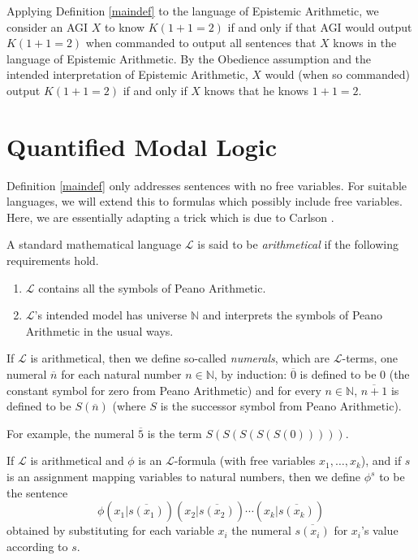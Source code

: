 \documentclass[runningheads]{llncs}
\begin{document}
\begin{example}
Applying Definition \ref{maindef} to the language of Epistemic Arithmetic,
we consider an AGI $X$ to know $K(1+1=2)$ if and only if that AGI would output
$K(1+1=2)$ when commanded to output all sentences that $X$ knows in the language of
Epistemic Arithmetic. By the Obedience assumption and the intended interpretation of
Epistemic Arithmetic, $X$ would (when so commanded)
output $K(1+1=2)$ if and only if $X$ knows that he knows $1+1=2$.
\end{example}

\section{Quantified Modal Logic}
\label{quantifiedsection}

Definition \ref{maindef} only addresses sentences with no free variables.
For suitable languages, we will extend this to formulas which possibly include
free variables. Here, we are essentially adapting a trick which is due to
Carlson \cite{carlson}.

\begin{definition}
  A standard mathematical language $\mathscr L$ is said to be \emph{arithmetical}
  if the following requirements hold.
  \begin{enumerate}
    \item $\mathscr L$ contains all the symbols of Peano Arithmetic.
    \item $\mathscr L$'s intended model has universe $\mathbb N$ and interprets
    the symbols of Peano Arithmetic in the usual ways.
  \end{enumerate}
\end{definition}

\begin{definition}
  If $\mathscr L$ is arithmetical, then we define so-called \emph{numerals}, which
  are $\mathscr L$-terms, one numeral $\overline n$ for each natural number $n\in\mathbb N$,
  by induction: $\overline 0$ is defined to be $0$ (the constant symbol for zero from
  Peano Arithmetic) and
  for every $n\in\mathbb N$, $\overline{n+1}$ is defined to be $S(\overline n)$
  (where $S$ is the successor symbol from Peano Arithmetic).
\end{definition}

For example, the numeral $\overline 5$ is the term $S(S(S(S(S(0)))))$.

\begin{definition}
  If $\mathscr L$ is arithmetical and $\phi$ is an $\mathscr L$-formula (with free variables
  $x_1,\ldots,x_k$),
  and if $s$ is an assignment mapping variables to natural numbers, then we define $\phi^s$
  to be the sentence
  \[
    \phi(x_1|\overline{s(x_1)})(x_2|\overline{s(x_2)})\cdots (x_k|\overline{s(x_k)})
  \]
  obtained by substituting for each variable $x_i$ the numeral $\overline{s(x_i)}$
  for $x_i$'s value according to $s$.
\end{definition}
\end{document}
